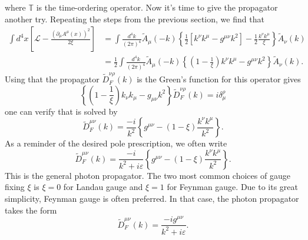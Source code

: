 \documentclass[twoside,utf8]{article}
\begin{document}
where $\mathbb{T}$ is the time-ordering operator. Now it's time to give the propagator another try. Repeating the steps from the previous section, we find that
\begin{equation*}
\begin{align}
\int d^4x \left[\mathcal{L}-\frac{(\partial_\mu A^\mu(x))^2}{2\xi} \right]
&=
\int \frac{d^4 k}{(2\pi)^4} \tilde{A}_\mu(-k) \left\{
\frac{1}{2}\left[
 k^\nu k^\mu - g^{\mu\nu} k^2
\right]-\frac{1}{2}\frac{k^\nu k^\mu}{\xi}
\right\}
\tilde{A}_\nu(k) \\
&=
\frac{1}{2} \int \frac{d^4 k}{(2\pi)^4} \tilde{A}_\mu(-k) \left\{
 \left(1-\frac{1}{\xi}\right)k^\nu k^\mu - g^{\mu\nu} k^2
\right\}
\tilde{A}_\nu(k).
\end{align}
\end{equation*}
Using that the propagator $\tilde{D}_F^{\nu\rho}(k)$ is the Green's function for this operator gives
\[
\left\{
 \left(1-\frac{1}{\xi}\right)k_\nu k_\mu - g_{\mu\nu} k^2
\right\} \tilde{D}_F^{\nu\rho}(k) = i\delta^\rho_\mu
\]
one can verify that is solved by
\[
\tilde{D}_F^{\mu\nu}(k) = \frac{-i}{k^2}\left\{
g^{\mu\nu} -\left(1-\xi\right)\frac{k^\nu k^\mu}{k^2}
\right\}.
\]
As a reminder of the desired pole prescription, we often write
\[
\tilde{D}_F^{\mu\nu}(k) = \frac{-i}{k^2+i\varepsilon}\left\{
g^{\mu\nu} -\left(1-\xi\right)\frac{k^\nu k^\mu}{k^2}
\right\}.
\]
This is the general photon propagator. The two most common choices of gauge fixing $\xi$ is $\xi=0$ for Landau gauge and $\xi=1$ for Feynman gauge. Due to its great simplicity, Feynman gauge is often preferred. In that case, the photon propagator takes the form
\[
\tilde{D}_F^{\mu\nu}(k) = \frac{-ig^{\mu\nu}}{k^2+i\varepsilon}.
\]
\end{document}
